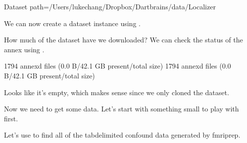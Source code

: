 \documentclass[letterpaper,10pt,english]{sphinxmanual}
\begin{document}
\begin{sphinxVerbatim}[commandchars=\\\{\}]
\PYGZlt{}Dataset path=/Users/lukechang/Dropbox/Dartbrains/data/Localizer\PYGZgt{}
\end{sphinxVerbatim}

We can now create a dataset instance using .

\begin{sphinxVerbatim}[commandchars=\\\{\}]
  
\end{sphinxVerbatim}

How much of the dataset have we downloaded?  We can check the status of the annex using .

\begin{sphinxVerbatim}[commandchars=\\\{\}]
  
\end{sphinxVerbatim}

\begin{sphinxVerbatim}[commandchars=\\\{\}]
1794 annex\PYGZsq{}d files (0.0 B/42.1 GB present/total size)
1794 annex\PYGZsq{}d files (0.0 B/42.1 GB present/total size)
\end{sphinxVerbatim}

Looks like it’s empty, which makes sense since we only cloned the dataset.

Now we need to get some data. Let’s start with something small to play with first.

Let’s use  to find all of the tab\sphinxhyphen{}delimited confound data generated by fmriprep.

\begin{sphinxVerbatim}[commandchars=\\\{\}]
       
\PYG{p}{[}\PYG{p}{]}
\end{sphinxVerbatim}
\end{document}
